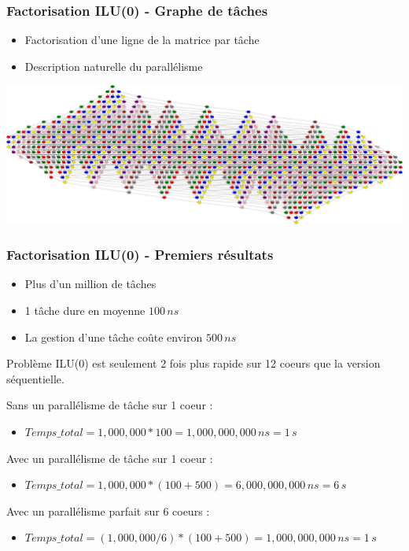 \documentclass{beamer}
\begin{document}
\begin{frame}
  \frametitle{Factorisation ILU(0) - Graphe de tâches}

  \begin{itemize}
    \item Factorisation d'une ligne de la matrice par tâche
    \item Description naturelle du parallélisme
  \end{itemize}

  \centerline{\includegraphics[width=\linewidth]{G1}}
\end{frame}




\begin{frame}
  \frametitle{Factorisation ILU(0) - Premiers résultats}

  \begin{itemize}
        \item Plus d'un million de tâches
        \item 1 tâche dure en moyenne $100\,ns$
        \item La gestion d'une tâche coûte environ $500\,ns$
  \end{itemize}

  \begin{alertblock}{Problème}
    ILU(0) est seulement 2 fois plus rapide sur 12 coeurs que la version séquentielle.
  \end{alertblock}

  \pause

  Sans un parallélisme de tâche sur 1 coeur :
  \begin{itemize}
     \item $Temps\_total = 1,000,000 * 100 = 1,000,000,000\,ns = 1\,s$
  \end{itemize}

  \pause

  Avec un parallélisme de tâche sur 1 coeur :
  \begin{itemize}
     \item $Temps\_total = 1,000,000 * (100 + 500) = 6,000,000,000\,ns = 6\,s$
  \end{itemize}

  \pause

  Avec un parallélisme parfait sur 6 coeurs :
  \begin{itemize}
     \item $Temps\_total = (1,000,000 / 6) * (100 + 500) = 1,000,000,000\,ns = 1\,s$
  \end{itemize}
\end{frame}
\end{document}
